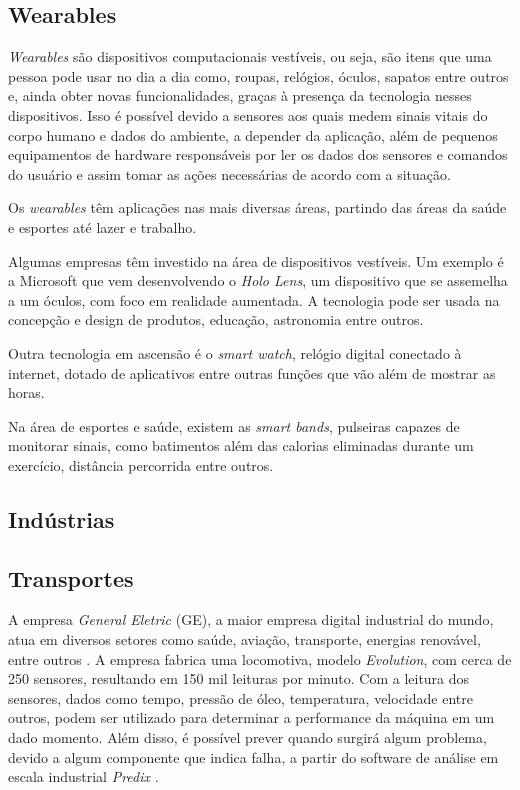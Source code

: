 \documentclass[
	article,			%
	11pt,				%
	oneside,			%
	a4paper,			%
	section=TITLE,		%
	subsection=TITLE,	%
	english,			%
	brazil,				%
	sumario=tradicional
	]{abntex2}
\begin{document}
\subsection{Wearables}

\textit{Wearables} são dispositivos computacionais vestíveis, ou seja, são itens que uma pessoa pode usar no dia a dia como, roupas, relógios, óculos, sapatos entre outros e, ainda obter novas funcionalidades, graças à presença da tecnologia nesses dispositivos. Isso é possível devido a sensores aos quais medem sinais vitais do corpo humano e dados do ambiente, a depender da aplicação, além de pequenos equipamentos de hardware responsáveis por ler os dados dos sensores e comandos do usuário e assim tomar as ações necessárias de acordo com a situação.

Os \textit{wearables} têm aplicações nas mais diversas áreas, partindo das áreas da saúde e esportes até lazer e trabalho. 

Algumas empresas têm investido na área de dispositivos vestíveis. Um exemplo é a Microsoft que vem desenvolvendo o \textit{Holo Lens}, um dispositivo que se assemelha a um óculos, com foco em realidade aumentada. A tecnologia pode ser usada na concepção e design de produtos, educação, astronomia entre outros.

Outra tecnologia em ascensão é o \textit{smart watch}, relógio digital conectado à internet, dotado de aplicativos entre outras funções que vão além de mostrar as horas.

Na área de esportes e saúde, existem as \textit{smart bands}, pulseiras capazes de monitorar sinais, como batimentos além das calorias eliminadas durante um exercício, distância percorrida entre outros.


\subsection{Indústrias}


\subsection{Transportes}


A empresa \textit{General Eletric} (GE), a maior empresa digital industrial do mundo, atua em diversos setores como saúde, aviação, transporte, energias renovável, entre outros \cite{generalelectric2017} . A empresa fabrica uma locomotiva, modelo \textit{Evolution}, com cerca de 250 sensores, resultando em 150 mil leituras por minuto. Com a leitura dos sensores, dados como tempo, pressão de óleo, temperatura, velocidade entre outros, podem ser utilizado para determinar a performance da máquina em um dado momento. Além disso, é possível prever quando surgirá algum problema, devido a algum componente que indica falha, a partir do software de análise em escala industrial \textit{Predix} \cite{danielterdiman2014}.
\end{document}
